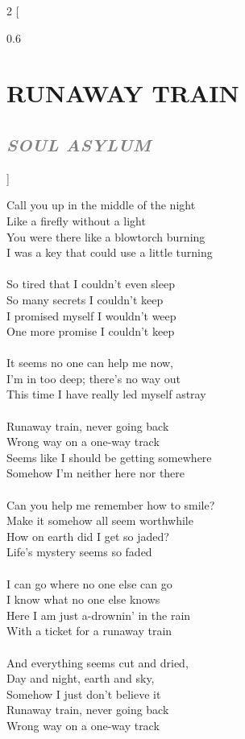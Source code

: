\documentclass[100pt,a4paper]{report}
\newenvironment{song2}[2]
	{	
    	\begin{multicols*}{2}
		[
			\begin{spacing}{0.6}
				\section*{\LARGE\centering \MakeUppercase{\textbf{{#1}}}}
				\subsection*{\Large\centering \textit{\textcolor{gray}{\MakeUppercase{{#2}}}}}
			\end{spacing}
		]
		\Large
	}
	{
	\end{multicols*}
	\newpage
    }
\begin{document}
\begin{song2}{Runaway train}{Soul Asylum}
\noindent
Call you up in the middle of the night\\
Like a firefly without a light\\
You were there like a blowtorch burning\\
I was a key that could use a little turning\\
\\
So tired that I couldn't even sleep\\
So many secrets I couldn't keep\\
I promised myself I wouldn't weep\\
One more promise I couldn't keep\\
\\
It seems no one can help me now,\\
I'm in too deep; there's no way out\\
This time I have really led myself astray\\
\\
Runaway train, never going back\\
Wrong way on a one-way track\\
Seems like I should be getting somewhere\\
Somehow I'm neither here nor there\\
\\
Can you help me remember how to smile?\\
Make it somehow all seem worthwhile\\
How on earth did I get so jaded?\\
Life's mystery seems so faded\\
\\
I can go where no one else can go\\
I know what no one else knows\\
Here I am just a-drownin' in the rain\\
With a ticket for a runaway train\\
\\
And everything seems cut and dried,\\
Day and night, earth and sky,\\
Somehow I just don't believe it\\
\vfill
\columnbreak
\noindent
Runaway train, never going back\\
Wrong way on a one-way track\\

\end{song2}
\end{document}
